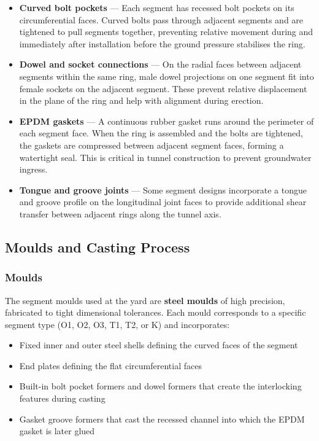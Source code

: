 \begin{itemize}
    \item \textbf{Curved bolt pockets} --- Each segment has recessed bolt pockets on its circumferential faces. Curved bolts pass through adjacent segments and are tightened to pull segments together, preventing relative movement during and immediately after installation before the ground pressure stabilises the ring.
    \item \textbf{Dowel and socket connections} --- On the radial faces between adjacent segments within the same ring, male dowel projections on one segment fit into female sockets on the adjacent segment. These prevent relative displacement in the plane of the ring and help with alignment during erection.
    \item \textbf{EPDM gaskets} --- A continuous rubber gasket runs around the perimeter of each segment face. When the ring is assembled and the bolts are tightened, the gaskets are compressed between adjacent segment faces, forming a watertight seal. This is critical in tunnel construction to prevent groundwater ingress.
    \item \textbf{Tongue and groove joints} --- Some segment designs incorporate a tongue and groove profile on the longitudinal joint faces to provide additional shear transfer between adjacent rings along the tunnel axis.
\end{itemize}

\subsection{Moulds and Casting Process}

\subsubsection{Moulds}
\par\noindent
The segment moulds used at the yard are \textbf{steel moulds} of high precision, fabricated to tight dimensional tolerances. Each mould corresponds to a specific segment type (O1, O2, O3, T1, T2, or K) and incorporates:

\begin{itemize}
    \item Fixed inner and outer steel shells defining the curved faces of the segment
    \item End plates defining the flat circumferential faces
    \item Built-in bolt pocket formers and dowel formers that create the interlocking features during casting
    \item Gasket groove formers that cast the recessed channel into which the EPDM gasket is later glued
\end{itemize}

